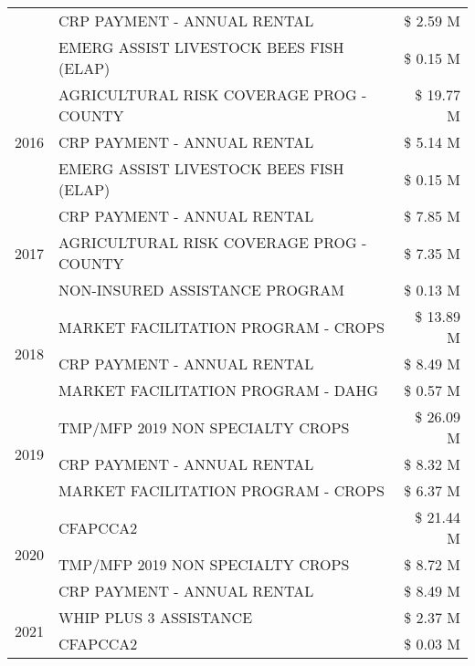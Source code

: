 \begin{tabular}{llr}
 & CRP PAYMENT - ANNUAL RENTAL & \$ 2.59 M \\
 & EMERG ASSIST LIVESTOCK BEES FISH (ELAP) & \$ 0.15 M \\
\cline{1-3}
\multirow[t]{3}{*}{2016} & AGRICULTURAL RISK COVERAGE PROG - COUNTY & \$ 19.77 M \\
 & CRP PAYMENT - ANNUAL RENTAL & \$ 5.14 M \\
 & EMERG ASSIST LIVESTOCK BEES FISH (ELAP) & \$ 0.15 M \\
\cline{1-3}
\multirow[t]{3}{*}{2017} & CRP PAYMENT - ANNUAL RENTAL & \$ 7.85 M \\
 & AGRICULTURAL RISK COVERAGE PROG - COUNTY & \$ 7.35 M \\
 & NON-INSURED ASSISTANCE PROGRAM & \$ 0.13 M \\
\cline{1-3}
\multirow[t]{3}{*}{2018} & MARKET FACILITATION PROGRAM - CROPS & \$ 13.89 M \\
 & CRP PAYMENT - ANNUAL RENTAL & \$ 8.49 M \\
 & MARKET FACILITATION PROGRAM - DAHG & \$ 0.57 M \\
\cline{1-3}
\multirow[t]{3}{*}{2019} & TMP/MFP 2019 NON SPECIALTY CROPS & \$ 26.09 M \\
 & CRP PAYMENT - ANNUAL RENTAL & \$ 8.32 M \\
 & MARKET FACILITATION PROGRAM - CROPS & \$ 6.37 M \\
\cline{1-3}
\multirow[t]{3}{*}{2020} & CFAPCCA2 & \$ 21.44 M \\
 & TMP/MFP 2019 NON SPECIALTY CROPS & \$ 8.72 M \\
 & CRP PAYMENT - ANNUAL RENTAL & \$ 8.49 M \\
\cline{1-3}
\multirow[t]{2}{*}{2021} & WHIP PLUS 3 ASSISTANCE & \$ 2.37 M \\
 & CFAPCCA2 & \$ 0.03 M \\
\cline{1-3}
\bottomrule
\end{tabular}

